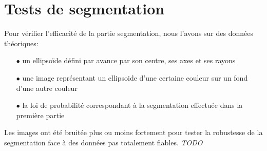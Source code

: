 \documentclass{article}
\begin{document}
\section{Tests de segmentation}

Pour vérifier l'efficacité de la partie segmentation, nous l'avons sur des données théoriques:
\begin{itemize}
	\item[$\bullet$] un ellipsoïde défini par avance par son centre, ses axes et ses rayons
	\item[$\bullet$] une image représentant un ellipsoide d'une certaine couleur sur un fond d'une autre couleur
	\item[$\bullet$] la loi de probabilité correspondant à la segmentation effectuée dans la première partie
\end{itemize} 
Les images ont été bruitée plus ou moins fortement pour tester la robustesse de la segmentation face à des données pas totalement fiables.
\textit{TODO}

\end{document}
